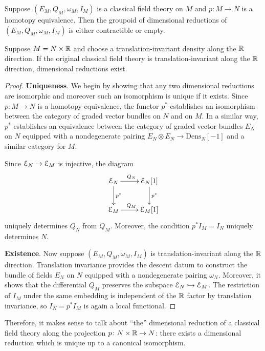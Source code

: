 \documentclass[10pt, oneside]{article}
\newcommand{\Dens}{\mathrm{Dens}}
\begin{document}
\begin{prop}
Suppose $(E_M, Q_M, \omega_M, I_M)$ is a classical field theory on $M$ and $p\colon M\rightarrow N$ is a homotopy equivalence. Then the groupoid of dimensional reductions of $(E_M, Q_M, \omega_M, I_M)$ is either contractible or empty.

Suppose $M=N\times \mathbb R$ and choose a translation-invariant density along the $\mathbb R$ direction. If the original classical field theory is translation-invariant along the $\mathbb R$ direction, dimensional reductions exist.
\label{prop:dimensionalreductionunique}
\end{prop}
\begin{proof} \textbf{Uniqueness}. We begin by showing that any two dimensional reductions are isomorphic and moreover such an isomorphism is unique if it exists. Since $p\colon M\rightarrow N$ is a homotopy equivalence, the functor $p^*$ establishes an isomorphism between the category of graded vector bundles on $N$ and on $M$. In a similar way, $p^*$ establishes an equivalence between the category of graded vector bundles $E_N$ on $N$ equipped with a nondegenerate pairing $E_N\otimes E_N\rightarrow \Dens_N[-1]$ and a similar category for $M$.

Since $\mathcal E_N\rightarrow \mathcal E_M$ is injective, the diagram
\[
\xymatrix{
\cE_N \ar^{Q_N}[r] \ar^{p^*}[d] & \cE_N[1] \ar^{p^*}[d] \\
\cE_M \ar^{Q_M}[r] & \cE_M[1]
}
\]
uniquely determines $Q_N$ from $Q_M$. Moreover, the condition $p^* I_M = I_N$ uniquely determines $N$.

\textbf{Existence}. Now suppose $(E_M, Q_M, \omega_M, I_M)$ is translation-invariant along the $\mathbb R$ direction. Translation invariance provides the descent datum to construct the bundle of fields $E_N$ on $N$ equipped with a nondegenerate pairing $\omega_N$. Moreover, it shows that the differential $Q_M$ preserves the subspace $\mathcal E_N\hookrightarrow \mathcal E_M$. The restriction of $I_M$ under the same embedding is independent of the $\mathbb R$ factor by translation invariance, so $I_N=p^* I_M$ is again a local functional.
\end{proof}

\begin{remark}
Therefore, it makes sense to talk about ``the'' dimensional reduction of a classical field theory along the projection $p \colon N \times \mathbb R \to N$: there exists a dimensional reduction which is unique up to a canonical isomorphism.
\end{remark}
\end{document}

